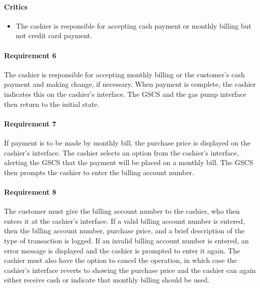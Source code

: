 \begin{framed}
    \paragraph{Critics} 
    \begin{itemize}
        \item The cashier is responsible for accepting cash payment or
            monthly billing but not credit card payment.
    \end{itemize}

    \paragraph{Requirement 6} The cashier is responsible for accepting
    monthly billing or the
    customer's cash payment and making change, if necessary. When payment is
    complete, the cashier indicates this on the cashier's interface. The GSCS
    and the gas pump interface then return to the initial state.
\end{framed}

\paragraph{Requirement 7} If payment is to be made by monthly bill, the
purchase price is displayed on the cashier's interface. The cashier
selects an option from the cashier's interface, alerting the GSCS that the
payment will be placed on a monthly bill. The GSCS then prompts the cashier
to enter the billing account number.

\paragraph{Requirement 8} The customer must give the billing account number
to the cashier, who then enters it at the cashier's interface. If a valid
billing account number is entered, then the billing account number, purchase
price, and a brief description of the type of transaction is logged. If an
invalid billing account number is entered, an error message is displayed
and the cashier is prompted to enter it again. The cashier must also have
the option to cancel the operation, in which case the cashier's interface
reverts to showing the purchase price and the cashier can again either
receive cash or indicate that monthly billing should be used.

